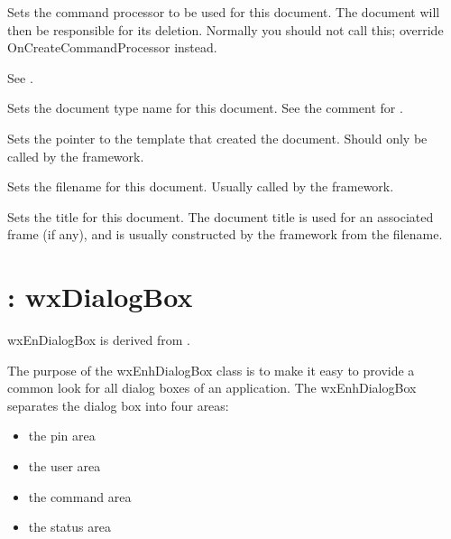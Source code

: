 

Sets the command processor to be used for this document. The document will then be responsible
for its deletion. Normally you should not call this; override OnCreateCommandProcessor
instead.

See .



Sets the document type name for this document. See the comment for .



Sets the pointer to the template that created the document. Should only be called by the
framework.



Sets the filename for this document. Usually called by the framework.



Sets the title for this document. The document title is used for an associated
frame (if any), and is usually constructed by the framework from
the filename.

\section{: wxDialogBox}\label{wxenhdialogbox}

wxEnDialogBox is derived from .

The purpose of the wxEnhDialogBox class is to make it easy to
provide a common look for all dialog boxes of an application. The
wxEnhDialogBox separates the dialog box into four areas:

\begin{itemize}\itemsep=0pt
\item the pin area
\item the user area
\item the command area
\item the status area
\end{itemize}

